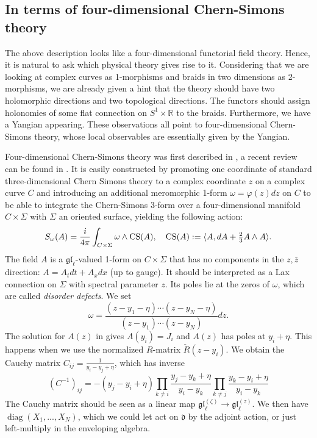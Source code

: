 \documentclass[11pt]{report}
\theoremstyle{definition}
\theoremstyle{remark}
\theoremstyle{remark}
\newcommand{\R}{\mathbb{R}}
\begin{document}
\pagebreak

\subsection{In terms of four-dimensional Chern-Simons theory}

The above description looks like a four-dimensional functorial field theory. Hence, it is natural to ask which physical theory gives rise to it. Considering that we are looking at complex curves as 1-morphisms and braids in two dimensions as 2-morphisms, we are already given a hint that the theory should have two holomorphic directions and two topological directions. The functors should assign holonomies of some flat connection on $S^1 \times \R$ to the braids. Furthermore, we have a Yangian appearing. These observations all point to four-dimensional Chern-Simons theory, whose local observables are essentially given by the Yangian.

Four-dimensional Chern-Simons theory was first described in \cite{article:costello:2013}, a recent review can be found in \cite{article:lacroix:2022}. It is easily constructed by promoting one coordinate of standard three-dimensional Chern Simons theory to a complex coordinate $z$ on a complex curve $C$ and introducing an additional meromorphic 1-form $\omega = \varphi(z) dz$ on $C$ to be able to integrate the Chern-Simons 3-form over a four-dimensional manifold $C \times \Sigma$ with $\Sigma$ an oriented surface, yielding the following action:
\begin{equation*}
S_\omega(A) = \frac{i}{4\pi} \int_{C \times \Sigma} \omega \wedge \textnormal{CS}(A), \quad \textnormal{CS}(A) := \langle A, dA + \tfrac 23 A \wedge A \rangle.
\end{equation*}
The field $A$ is a $\mathfrak{gl}_\ell$-valued 1-form on $C \times \Sigma$ that has no components in the $z,\bar z$ direction: $A = A_t dt + A_x dx$ (up to gauge). It should be interpreted as a Lax connection on $\Sigma$ with spectral parameter $z$. Its poles lie at the zeros of $\omega$, which are called \emph{disorder defects}. We set
\begin{equation*}
\omega = \frac{(z-y_1-\eta) \cdots (z-y_N-\eta)}{(z-y_1) \cdots (z-y_N)} dz.
\end{equation*}
The solution for $A(z)$ in \cite{article:lacroix:2021} gives $A(y_i) = J_i$ and $A(z)$ has poles at $y_i+\eta$. This happens when we use the normalized $R$-matrix $\check R(z-y_i)$. We obtain the Cauchy matrix $C_{ij} = \frac{1}{y_i-y_j+\eta}$, which has inverse
\begin{equation*}
(C^{-1})_{ij} = -(y_j-y_i+\eta) \prod_{k \neq i} \frac{y_j-y_k+\eta}{y_i-y_k} \prod_{k \neq j} \frac{y_k-y_i+\eta}{y_i-y_k}
\end{equation*}
The Cauchy matrix should be seen as a linear map $\mathfrak{gl}_\ell^{(\zeta)} \to \mathfrak{gl}_\ell^{(z)}$. We then have $\operatorname{diag}(X_1,...,X_N)$, which we could let act on $\mathfrak{d}$ by the adjoint action, or just left-multiply in the enveloping algebra.
\end{document}
